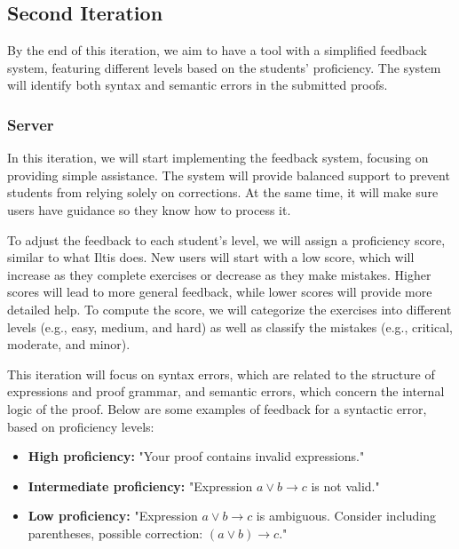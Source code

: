 \subsection{Second Iteration}
By the end of this iteration, we aim to have a tool with a simplified feedback system, featuring different levels based on the students' proficiency. The system will identify both syntax and semantic errors in the submitted proofs.

\subsubsection{Server}
In this iteration, we will start implementing the feedback system, focusing on providing simple assistance. The system will provide balanced support to prevent students from relying solely on corrections. At the same time, it will make sure users have guidance so they know how to process it. 

To adjust the feedback to each student's level, we will assign a proficiency score, similar to what Iltis does. New users will start with a low score, which will increase as they complete exercises or decrease as they make mistakes. Higher scores will lead to more general feedback, while lower scores will provide more detailed help. To compute the score, we will categorize the exercises into different levels (e.g., easy, medium, and hard) as well as classify the mistakes (e.g., critical, moderate, and minor).

This iteration will focus on syntax errors, which are related to the structure of expressions and proof grammar, and semantic errors, which concern the internal logic of the proof. Below are some examples of feedback for a syntactic error, based on proficiency levels:
\begin{itemize}
    \item \textbf{High proficiency:} "Your proof contains invalid expressions."
    \item \textbf{Intermediate proficiency:} "Expression \(a \lor b \to c\) is not valid."
    \item \textbf{Low proficiency:} "Expression \(a \lor b \to c\) is ambiguous. Consider including parentheses, possible correction: \((a \lor b) \to c\)."
\end{itemize}

